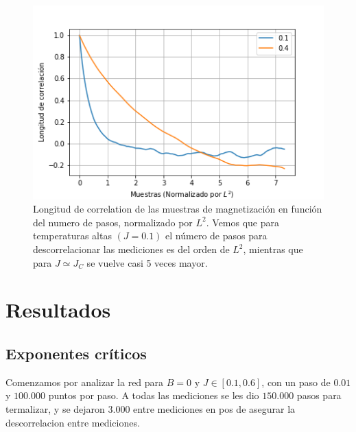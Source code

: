 \documentclass[%
 reprint,
 amsmath,amssymb,
 aps,
]{revtex4-1}
\begin{document}
\begin{figure}
  \includegraphics[width=1.0\columnwidth]{images/correlation.png}
  \caption{Longitud de correlation de las muestras de magnetizaci\'on en
    funci\'on del numero de pasos, normalizado por $L^2$. Vemos que para
    temperaturas altas $(J = 0.1)$ el n\'umero de pasos para descorrelacionar
    las mediciones es del orden de $L^2$, mientras que para $J \simeq J_C$ se
    vuelve casi 5 veces mayor.}
  \label{correlation}
\end{figure}

\section{Resultados}

\subsection{Exponentes cr\'iticos}

Comenzamos por analizar la red para $B = 0$ y $J\in[0.1, 0.6]$,
con un paso de $0.01$ y $100.000$ puntos por paso. A todas las mediciones se les
dio $150.000$ pasos para termalizar, y se dejaron $3.000$ entre mediciones en pos
de asegurar la descorrelacion entre mediciones.
\end{document}
